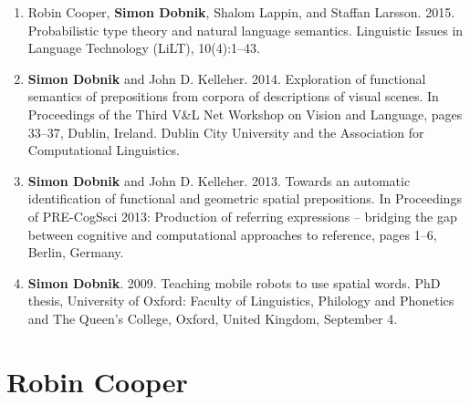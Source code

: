 \documentclass{article}
\begin{document}
\begin{enumerate}
\item Robin Cooper, \textbf{Simon Dobnik}, Shalom Lappin, and Staffan Larsson. 2015. Probabilistic type theory and natural language semantics. Linguistic Issues in Language Technology (LiLT), 10(4):1–43.

\item \textbf{Simon Dobnik} and John D. Kelleher. 2014. Exploration of functional semantics of prepositions from corpora of descriptions of visual scenes. In Proceedings of the Third V\&L Net Workshop on Vision and Language, pages 33–37, Dublin, Ireland. Dublin City University and the Association for Computational Linguistics.

\item \textbf{Simon Dobnik} and John D. Kelleher. 2013. Towards an automatic identification of functional and geometric spatial prepositions. In Proceedings of PRE-CogSsci 2013: Production of referring expressions – bridging the gap between cognitive and computational approaches to reference, pages 1–6, Berlin, Germany.

\item \textbf{Simon Dobnik}. 2009. Teaching mobile robots to use spatial words. PhD thesis, University of Oxford: Faculty of Linguistics, Philology and Phonetics and The Queen’s College, Oxford, United Kingdom, September 4.

\end{enumerate}

\newpage
{}
\section*{Robin Cooper}
\end{document}
